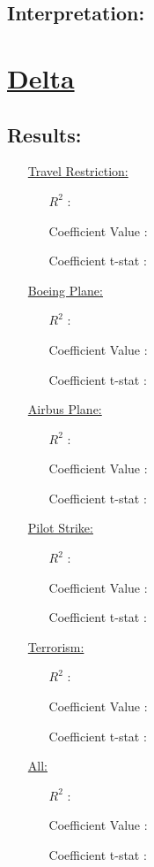 \documentclass[12pt]{report}
\begin{document}
\subsection*{Interpretation:}

\newpage
\section*{\underline{Delta}}
\subsection*{Results:}
\begin{enumerate}
    \item[\underline{Travel Restriction:}]
        \begin{enumerate}
            \item[$R^2$]:
            \item[Coefficient Value]:
            \item[Coefficient t-stat]:
        \end{enumerate}
    \item[\underline{Boeing Plane:}]
        \begin{enumerate}
            \item[$R^2$]:
            \item[Coefficient Value]:
            \item[Coefficient t-stat]:
        \end{enumerate}
    \item[\underline{Airbus Plane:}]
        \begin{enumerate}
            \item[$R^2$]:
            \item[Coefficient Value]:
            \item[Coefficient t-stat]:
        \end{enumerate}
    \item[\underline{Pilot Strike:}]
        \begin{enumerate}
            \item[$R^2$]:
            \item[Coefficient Value]:
            \item[Coefficient t-stat]:
        \end{enumerate}
    \item[\underline{Terrorism:}]
        \begin{enumerate}
            \item[$R^2$]:
            \item[Coefficient Value]:
            \item[Coefficient t-stat]:
        \end{enumerate}
    \item[\underline{All:}]
        \begin{enumerate}
            \item[$R^2$]:
            \item[Coefficient Value]:
            \item[Coefficient t-stat]:
        \end{enumerate}
\end{enumerate}
\end{document}
